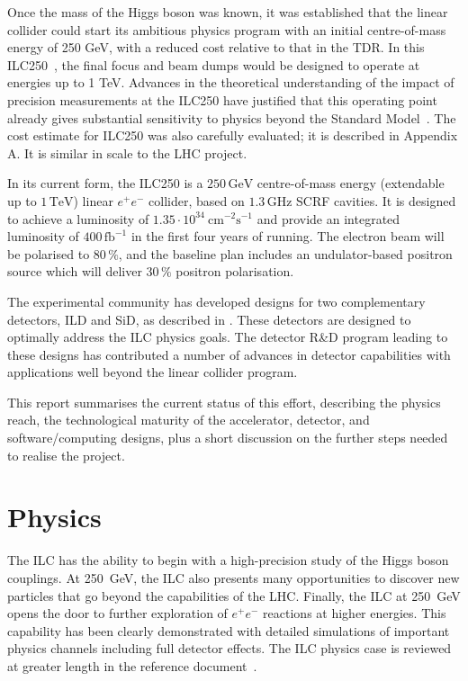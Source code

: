 \documentclass[%
 reprint,
 amsmath,amssymb,
 aps,
]{revtex4-1}
\def\ee{e^+e^-}
\begin{document}
Once the mass of the Higgs boson was known, it was established that the
linear collider could start its ambitious physics program with an initial centre-of-mass energy of 250 GeV, with a reduced cost relative to that in the TDR.  In this ILC250~\cite{Evans:2017rvt}, the final focus and beam dumps would be designed to operate at energies up to 1 TeV.
Advances in the theoretical understanding of the impact of precision
measurements at the 
 ILC250 have justified that this operating point already gives
 substantial 
sensitivity to physics beyond the Standard 
Model~\cite{Barklow:2017suo,Fujii:2017vwa}. 
 The cost estimate for ILC250 was also carefully evaluated;
it is described in Appendix A. It is similar in scale to the
LHC 
project.


In its current
form, the ILC250 is a $250\,{\mathrm{GeV}}$ centre-of-mass energy
(extendable up to $1\,{\mathrm{TeV}}$) linear $e^+e^-$ collider, based
on $1.3\,{\mathrm{GHz}}$  SCRF
cavities. It is designed to achieve a luminosity of $1.35\cdot
10^{34}~{\mathrm{cm}}^{-2}{\mathrm{s}}^{-1}$ and provide an integrated
luminosity of $400\,{\mathrm{fb}}^{-1}$ in the first four years of
running. The electron beam will be polarised to $80\,\%$, and the baseline plan includes an 
undulator-based
positron source which will  deliver
$30\,\%$ positron  polarisation. 


The experimental community has developed
designs for two complementary detectors, ILD and SiD, 
as described in \cite{Behnke:2013lya}. These detectors are designed to 
optimally address the
ILC physics goals.  The detector R\&D program leading to these designs
has 
contributed a number of advances in 
detector capabilities with applications well beyond the linear
collider program. 

This report summarises the current status of this effort, describing
the physics reach, the technological maturity of the accelerator,
detector, and software/computing designs,
plus a short discussion on the further steps 
 needed to realise the project.

\vspace{-.4cm}

\section{\label{sec:phys}Physics}

\vspace{-.3cm}

The ILC has the ability to begin with a high-precision study of the Higgs boson couplings.  At 250~GeV, the ILC also
presents many opportunities to discover new particles that go beyond
the capabilities of the LHC.  Finally, the ILC at 250~GeV opens the
door to further exploration of $\ee$ reactions at higher energies. This capability has been clearly demonstrated with detailed simulations of important physics channels including full detector effects. The ILC physics case is reviewed at greater length in the reference document~\cite{ILCforESS}.
\end{document}
